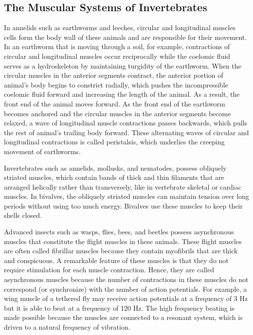 \hypertarget{the-muscular-systems-of-invertebrates}{%
\subsection{The Muscular Systems of Invertebrates}\label{the-muscular-systems-of-invertebrates}}

In annelids such as earthworms and leeches, circular and longitudinal muscles cells form the body wall of these animals and are responsible for their movement. In an earthworm that is moving through a soil, for example, contractions of circular and longitudinal muscles occur reciprocally while the coelomic fluid serves as a hydroskeleton by maintaining turgidity of the earthworm. When the circular muscles in the anterior segments contract, the anterior portion of animal's body begins to constrict radially, which pushes the incompressible coelomic fluid forward and increasing the length of the animal. As a result, the front end of the animal moves forward. As the front end of the earthworm becomes anchored and the circular muscles in the anterior segments become relaxed, a wave of longitudinal muscle contractions passes backwards, which pulls the rest of animal's trailing body forward. These alternating waves of circular and longitudinal contractions is called peristalsis, which underlies the creeping movement of earthworms.

Invertebrates such as annelids, mollusks, and nematodes, possess obliquely striated muscles, which contain bands of thick and thin filaments that are arranged helically rather than transversely, like in vertebrate skeletal or cardiac muscles. In bivalves, the obliquely striated muscles can maintain tension over long periods without using too much energy. Bivalves use these muscles to keep their shells closed.

Advanced insects such as wasps, flies, bees, and beetles possess asynchronous muscles that constitute the flight muscles in these animals. These flight muscles are often called fibrillar muscles because they contain myofibrils that are thick and conspicuous. A remarkable feature of these muscles is that they do not require stimulation for each muscle contraction. Hence, they are called asynchronous muscles because the number of contractions in these muscles do not correspond (or synchronize) with the number of action potentials. For example, a wing muscle of a tethered fly may receive action potentials at a frequency of 3 Hz but it is able to beat at a frequency of 120 Hz. The high frequency beating is made possible because the muscles are connected to a resonant system, which is driven to a natural frequency of vibration.


